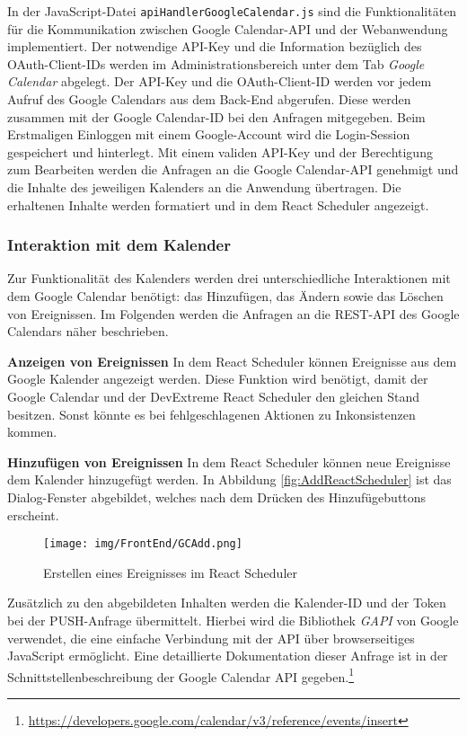 In der JavaScript-Datei \texttt{apiHandlerGoogleCalendar.js} sind die Funktionalitäten für die Kommunikation zwischen Google Calendar-\ac{API} und der Webanwendung implementiert. 
Der notwendige \ac{API}-Key und die Information bezüglich des OAuth-Client-IDs werden im Administrationsbereich unter dem Tab \textit{Google Calendar} abgelegt. 
Der \ac{API}-Key und die OAuth-Client-ID werden vor jedem Aufruf des Google Calendars aus dem Back-End abgerufen. 
Diese werden zusammen mit der Google Calendar-ID bei den Anfragen mitgegeben. 
Beim Erstmaligen Einloggen mit einem Google-Account wird die Login-Session gespeichert und hinterlegt. 
Mit einem validen \ac{API}-Key und der Berechtigung zum Bearbeiten werden die Anfragen an die Google Calendar-\ac{API} genehmigt und die Inhalte des jeweiligen Kalenders an die Anwendung übertragen.
Die erhaltenen Inhalte werden formatiert und in dem React Scheduler angezeigt.

\subsubsection{Interaktion mit dem Kalender}\label{ch:InteraktionGC}
Zur Funktionalität des Kalenders werden drei unterschiedliche Interaktionen mit dem Google Calendar benötigt: das Hinzufügen, das Ändern sowie das Löschen von Ereignissen. Im Folgenden werden die Anfragen an die \ac{REST}-\ac{API} des Google Calendars näher beschrieben.

\textbf{Anzeigen von Ereignissen}\newline
In dem React Scheduler können Ereignisse aus dem Google Kalender angezeigt werden.
Diese Funktion wird benötigt, damit der Google Calendar und der DevExtreme React Scheduler den gleichen Stand besitzen.
Sonst könnte es bei fehlgeschlagenen Aktionen zu Inkonsistenzen kommen.

\textbf{Hinzufügen von Ereignissen}\newline
In dem React Scheduler können neue Ereignisse dem Kalender hinzugefügt werden.
In Abbildung \vref{fig:AddReactScheduler} ist das Dialog-Fenster abgebildet, welches nach dem Drücken des Hinzufügebuttons erscheint.
\begin{figure}[H]
	\centering 
	\texttt{[image: img/FrontEnd/GCAdd.png]}
	\caption[Erstellen eines Ereignisses im React Scheduler]{\label{fig:AddReactScheduler}Erstellen eines Ereignisses im React Scheduler}
\end{figure}

Zusätzlich zu den abgebildeten Inhalten werden die Kalender-ID und der Token bei der PUSH-Anfrage übermittelt. Hierbei wird die Bibliothek \textit{GAPI} von Google verwendet, die eine einfache Verbindung mit der \ac{API} über browserseitiges JavaScript ermöglicht. 
Eine detaillierte Dokumentation dieser Anfrage ist in der Schnittstellenbeschreibung der Google Calendar \ac{API} gegeben.\footnote{\url{https://developers.google.com/calendar/v3/reference/events/insert}}

